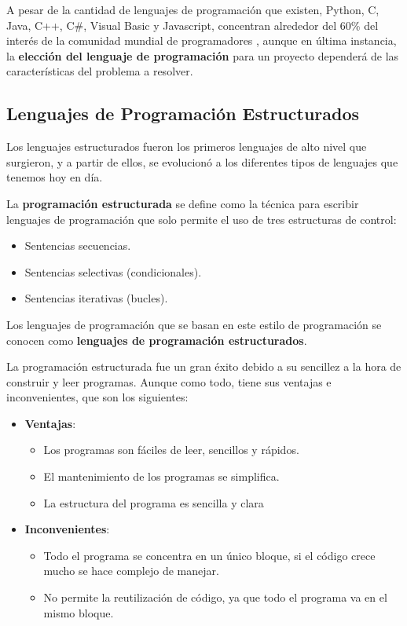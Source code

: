 A pesar de la cantidad de lenguajes de programación que existen, Python, C, Java, C++, C\#, Visual Basic y Javascript, concentran alrededor del 60\% del interés de la comunidad mundial de programadores \cite{tiobe}, aunque en última instancia, la \textbf{elección del lenguaje de programación} para un proyecto dependerá de las características del problema a resolver.

\subsection{Lenguajes de Programación Estructurados}
Los lenguajes estructurados fueron los primeros lenguajes de alto nivel que surgieron, y a partir de ellos, se evolucionó a los diferentes tipos de lenguajes que tenemos hoy en día.

La \textbf{programación estructurada} se define como la técnica para escribir lenguajes de programación que solo permite el uso de tres estructuras de control:

\begin{itemize}
    \item Sentencias secuencias.
    \item Sentencias selectivas (condicionales).
    \item Sentencias iterativas (bucles).
\end{itemize}

Los lenguajes de programación que se basan en este estilo de programación se conocen como \textbf{lenguajes de programación estructurados}.

La programación estructurada fue un gran éxito debido a su sencillez a la hora de construir y leer programas. Aunque como todo, tiene sus ventajas e inconvenientes, que son los siguientes:

\begin{itemize}
    \item \textbf{Ventajas}:
    \begin{itemize}
        \item Los programas son fáciles de leer, sencillos y rápidos.
        \item El mantenimiento de los programas se simplifica.
        \item La estructura del programa es sencilla y clara
    \end{itemize}
    \item \textbf{Inconvenientes}:
    \begin{itemize}
        \item Todo el programa se concentra en un único bloque, si el código crece mucho se hace complejo de manejar.
        \item No permite la reutilización de código, ya que todo el programa va en el mismo bloque.
    \end{itemize}
\end{itemize}

